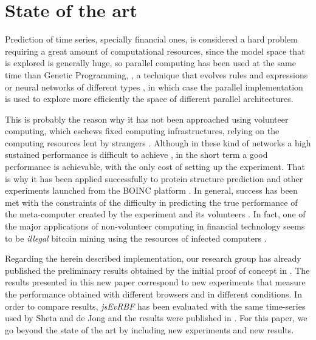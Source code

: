 \documentclass{article}
\begin{document}
\section{State of the art}

Prediction of time series, specially financial ones, is considered a
hard problem requiring a great amount of computational resources,
since the model space that is explored is generally huge, so parallel
computing has been used at the same time than Genetic Programming,
\cite{santini2001genetic}, a technique that evolves rules and
expressions or neural networks of different types \cite{niska2004evolving,Mora2010,DBLP:conf/iwann/ArenasPRCJG09,RIIACastillo2008}, in which case
the parallel implementation is used to explore more efficiently the
space of different parallel architectures.

This is probably the reason why it has not been approached using
volunteer computing, which eschews fixed computing infrastructures,
relying on the computing resources lent by strangers
\cite{daniel:euromicro09,gecco07:workshop:dcor,DBLP:journals/corr/abs-0801-1210,DBLP:conf/gecco/MereloCGCRV16,baratloo1996charlotte,hwang2009determinants,web:BOINC}. Although
in these kind of networks a high sustained performance is difficult to
achieve \cite{DBLP:conf/lion/LaredoGFMACG11,DBLP:conf/gecco/MereloCGCRV16}, in the short term a
  good performance is achievable, with the only cost of setting up the
  experiment. That is why it has been applied successfully to protein
  structure prediction \cite{taufer2006predictor} and other
  experiments launched from the BOINC platform \cite{boinc_grid04}. In
  general, success has been met with the constraints of the difficulty
  in predicting the true performance of the meta-computer created by
  the experiment and its volunteers \cite{Merelo2016}. In fact, one of
  the major applications of non-volunteer computing in financial
  technology seems to be {\em illegal} bitcoin mining using the
  resources of infected computers \cite{plohmann2012case}.

Regarding the herein described implementation, our research group has already published the preliminary results obtained by the
initial proof of concept in \cite{DBLP:conf/dcai/RivasPMAG16}. The results presented in this new paper correspond to new experiments that measure the
performance obtained with different browsers and in different
conditions. In order to compare results, {\em jsEvRBF} has been evaluated with the same time-series
used by Sheta and de Jong \cite{Sheta2001} and the results were
published in \cite{DBLP:conf/dcai/RivasPMAG16}. %
For this paper, we
go beyond the state of the art by including new experiments and new
results.
\end{document}

